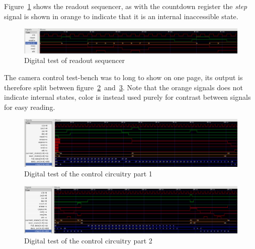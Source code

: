 Figure~\ref{fig:digreadouttest} shows the readout sequencer, as with the countdown register the \textit{step} signal is shown in orange to indicate
that it is an internal inaccessible state.

\begin{figure}[H]
  \centering
  \includegraphics[width=\textwidth]{figures/readoutTest}
  \caption{Digital test of readout sequencer}
  \label{fig:digreadouttest}
\end{figure}


The camera control test-bench was to long to show on one page, its output is therefore split between figure~\ref{fig:digcamtest1}~and~\ref{fig:digcamtest2}.
Note that the orange signals does not indicate internal states, color is instead used purely for contrast between signals for easy reading.

\begin{figure}[H]
  \centering
  \includegraphics[width=\textwidth]{figures/cameraTest1}
  \caption{Digital test of the control circuitry part 1}
  \label{fig:digcamtest1}
\end{figure}

\begin{figure}[H]
  \centering
  \includegraphics[width=\textwidth]{figures/cameraTest2}
  \caption{Digital test of the control circuitry part 2}
  \label{fig:digcamtest2}
\end{figure}
